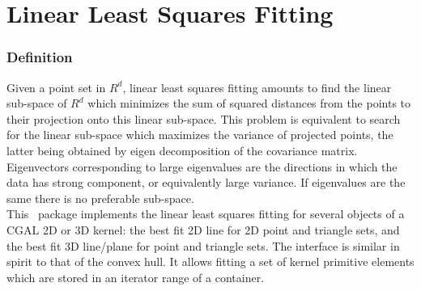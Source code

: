 
\chapter{Linear Least Squares Fitting}
\label{ref_chapter_pca}


\subsection*{Definition}

Given a point set in $R^d$, linear least squares fitting amounts to
find the linear sub-space of $R^d$ which minimizes the sum of squared
distances from the points to their projection onto this linear
sub-space. This problem is equivalent to search for the linear
sub-space which maximizes the variance of projected points, the latter
being obtained by eigen decomposition of the covariance
matrix. Eigenvectors corresponding to large eigenvalues are the
directions in which the data has strong component, or equivalently
large variance. If eigenvalues are the same there is no preferable
sub-space.\\

This \cgal\ package implements the linear least squares fitting for
several objects of a CGAL 2D or 3D kernel: the best fit 2D line for 2D
point and triangle sets, and the best fit 3D line/plane for point and
triangle sets. The interface is similar in spirit to that of the
convex hull. It allows fitting a set of kernel primitive elements
which are stored in an iterator range of a container.

\\


\\
\clearpage

